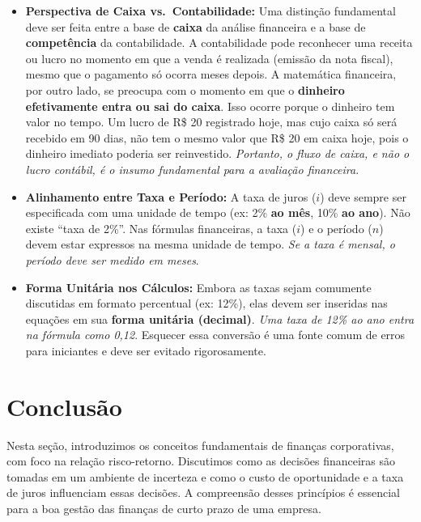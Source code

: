 \documentclass[
  a4paper,
]{book}
\begin{document}
\begin{tcolorbox}
\begin{itemize}
\item
  \textbf{Perspectiva de Caixa vs.~Contabilidade:} Uma distinção
  fundamental deve ser feita entre a base de \textbf{caixa} da análise
  financeira e a base de \textbf{competência} da contabilidade. A
  contabilidade pode reconhecer uma receita ou lucro no momento em que a
  venda é realizada (emissão da nota fiscal), mesmo que o pagamento só
  ocorra meses depois. A matemática financeira, por outro lado, se
  preocupa com o momento em que o \textbf{dinheiro efetivamente entra ou
  sai do caixa}. Isso ocorre porque o dinheiro tem valor no tempo. Um
  lucro de R\$ 20 registrado hoje, mas cujo caixa só será recebido em 90
  dias, não tem o mesmo valor que R\$ 20 em caixa hoje, pois o dinheiro
  imediato poderia ser reinvestido. \emph{Portanto, o fluxo de caixa, e
  não o lucro contábil, é o insumo fundamental para a avaliação
  financeira}.
\item
  \textbf{Alinhamento entre Taxa e Período:} A taxa de juros (\(i\))
  deve sempre ser especificada com uma unidade de tempo (ex: 2\%
  \textbf{ao mês}, 10\% \textbf{ao ano}). Não existe ``taxa de 2\%''.
  Nas fórmulas financeiras, a taxa (\(i\)) e o período (\(n\)) devem
  estar expressos na mesma unidade de tempo. \emph{Se a taxa é mensal, o
  período deve ser medido em meses}.
\item
  \textbf{Forma Unitária nos Cálculos:} Embora as taxas sejam comumente
  discutidas em formato percentual (ex: 12\%), elas devem ser inseridas
  nas equações em sua \textbf{forma unitária (decimal)}. \emph{Uma taxa
  de 12\% ao ano entra na fórmula como 0,12}. Esquecer essa conversão é
  uma fonte comum de erros para iniciantes e deve ser evitado
  rigorosamente.
\end{itemize}

\end{tcolorbox}

\section*{Conclusão}\label{conclusuxe3o}


Nesta seção, introduzimos os conceitos fundamentais de finanças
corporativas, com foco na relação risco-retorno. Discutimos como as
decisões financeiras são tomadas em um ambiente de incerteza e como o
custo de oportunidade e a taxa de juros influenciam essas decisões. A
compreensão desses princípios é essencial para a boa gestão das finanças
de curto prazo de uma empresa.
\end{document}
